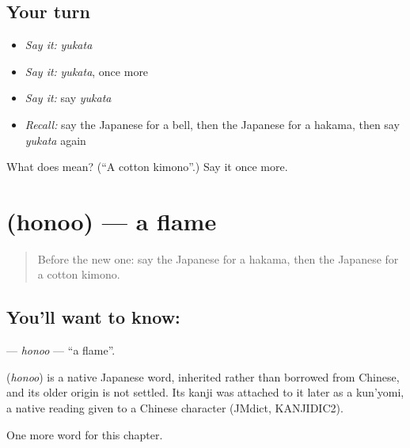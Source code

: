 \subsection*{Your turn}
\begin{itemize}
\raggedright
  \item \emph{Say it:} \emph{yukata}
  \item \emph{Say it:} \emph{yukata}, once more
  \item \emph{Say it:} say \emph{yukata}
  \item \emph{Recall:} say the Japanese for a bell, then the Japanese for a hakama, then say \emph{yukata} again
\end{itemize}

\begin{tcolorbox}[breakable,colback=teal!4,colframe=teal!35!black,title={Before you move on}]
What does  mean? (\textquotedblleft{}A cotton kimono\textquotedblright{}.) Say it once more.
\end{tcolorbox}
\section[\texorpdfstring{\ja{ほのお} (honoo)}{ほのお (honoo)}]{ (honoo) — a flame}

\label{lesson:JA-C105-honoo}



\begin{quote}
Before the new one: say the Japanese for a hakama, then the Japanese for a cotton kimono.
\end{quote}

\subsection*{You'll want to know: }
\textbf{} — \emph{honoo} — \textquotedblleft{}a flame\textquotedblright{}.

\begin{cousinweb}
\textbf{} (\emph{honoo}) is a native Japanese word, inherited rather than borrowed from Chinese, and its older origin is not settled. Its kanji was attached to it later as a kun'yomi, a native reading given to a Chinese character (JMdict, KANJIDIC2).
\end{cousinweb}

\begin{grammarlens}[title={What you've built}]
One more word for this chapter.
\end{grammarlens}

